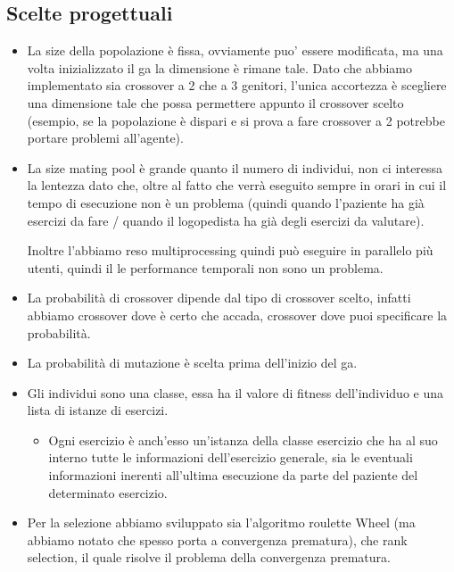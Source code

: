 \documentclass{article}
\begin{document}
\subsection{Scelte progettuali}

\begin{itemize}
\item La size della popolazione è fissa, ovviamente puo' essere modificata, ma una volta inizializzato il ga la dimensione è rimane tale.
Dato che abbiamo implementato sia crossover a 2 che a 3 genitori, l'unica accortezza è scegliere una dimensione tale che possa permettere appunto il crossover scelto (esempio, se la popolazione è dispari e si prova a fare crossover a 2 potrebbe portare problemi all'agente).

\item La size mating pool è grande quanto il numero di individui, non ci interessa la lentezza dato che, oltre al fatto che verrà eseguito sempre in orari in cui il tempo di esecuzione non è un problema (quindi quando l'paziente ha già esercizi da fare / quando il logopedista ha già degli esercizi da valutare). 

Inoltre l'abbiamo reso multiprocessing quindi può eseguire in parallelo più utenti, quindi il le performance temporali non sono un problema.

\item La probabilità di crossover dipende dal tipo di crossover scelto, infatti abbiamo crossover dove è certo che accada, crossover dove puoi specificare la probabilità.

\item La probabilità di mutazione è scelta prima dell'inizio del ga.

\item Gli individui sono una classe, essa ha il valore di fitness dell'individuo e una lista di istanze di esercizi.

\begin{itemize}

\item Ogni esercizio è anch'esso un'istanza della classe esercizio che ha al suo interno tutte le informazioni dell'esercizio generale, sia le eventuali informazioni inerenti all'ultima esecuzione da parte del paziente del determinato esercizio.

\end{itemize}

\item Per la selezione abbiamo sviluppato sia l'algoritmo roulette Wheel (ma abbiamo notato che spesso porta a convergenza prematura), che rank selection, il quale risolve il problema della convergenza prematura.


\end{itemize}
\end{document}

